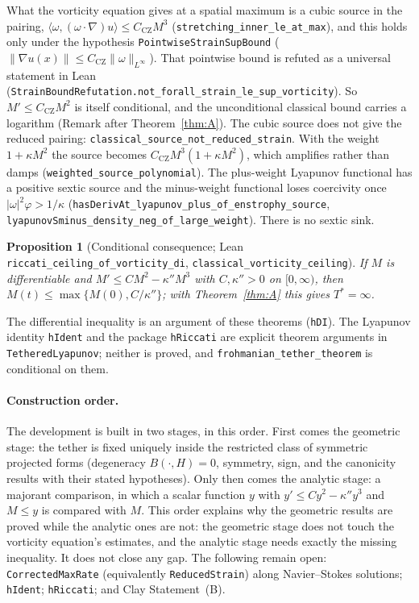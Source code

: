 \documentclass[11pt,reqno]{amsart}
\newtheorem{proposition}[theorem]{Proposition}
\theoremstyle{definition}
\newcommand{\lean}[1]{\texttt{#1}}
\newcommand{\norm}[1]{\lVert #1\rVert}
\begin{document}
What the vorticity equation gives at a spatial maximum is a cubic source in the pairing, $\langle\omega,(\omega\cdot\nabla)u\rangle\le C_{\mathrm{CZ}}M^3$ (\lean{stretching\_inner\_le\_at\_max}), and this holds only under the hypothesis \lean{PointwiseStrainSupBound} ($\norm{\nabla u(x)}\le C_{\mathrm{CZ}}\norm{\omega}_{L^\infty}$). That pointwise bound is refuted as a universal statement in Lean (\lean{StrainBoundRefutation.not\_forall\_strain\_le\_sup\_vorticity}). So $M'\le C_{\mathrm{CZ}}M^2$ is itself conditional, and the unconditional classical bound carries a logarithm (Remark after Theorem~\ref{thm:A}). The cubic source does not give the reduced pairing: \lean{classical\_source\_not\_reduced\_strain}. With the weight $1+\kappa M^2$ the source becomes $C_{\mathrm{CZ}}M^3(1+\kappa M^2)$, which amplifies rather than damps (\lean{weighted\_source\_polynomial}). The plus-weight Lyapunov functional has a positive sextic source and the minus-weight functional loses coercivity once $|\omega|^2\varphi>1/\kappa$ (\lean{hasDerivAt\_lyapunov\_plus\_of\_enstrophy\_source}, \lean{lyapunovSminus\_density\_neg\_of\_large\_weight}). There is no sextic sink.

\begin{proposition}[Conditional consequence; Lean \lean{riccati\_ceiling\_of\_vorticity\_di}, \lean{classical\_vorticity\_ceiling}]\label{prop:ceiling}
If $M$ is differentiable and $M'\le CM^2-\kappa''M^3$ with $C,\kappa''>0$ on $[0,\infty)$, then $M(t)\le\max\{M(0),C/\kappa''\}$; with Theorem~\ref{thm:A} this gives $T^*=\infty$.
\end{proposition}
The differential inequality is an argument of these theorems (\lean{hDI}). The Lyapunov identity \lean{hIdent} and the package \lean{hRiccati} are explicit theorem arguments in \lean{TetheredLyapunov}; neither is proved, and \lean{frohmanian\_tether\_theorem} is conditional on them.

\paragraph{Construction order.} The development is built in two stages, in this order. First comes the geometric stage: the tether is fixed uniquely inside the restricted class of symmetric projected forms (degeneracy $B(\cdot,H)=0$, symmetry, sign, and the canonicity results with their stated hypotheses). Only then comes the analytic stage: a majorant comparison, in which a scalar function $y$ with $y'\le C y^2-\kappa'' y^3$ and $M\le y$ is compared with $M$. This order explains why the geometric results are proved while the analytic ones are not: the geometric stage does not touch the vorticity equation's estimates, and the analytic stage needs exactly the missing inequality. It does not close any gap. The following remain open: \lean{CorrectedMaxRate} (equivalently \lean{ReducedStrain}) along Navier--Stokes solutions; \lean{hIdent}; \lean{hRiccati}; and Clay Statement~(B).
\end{document}
